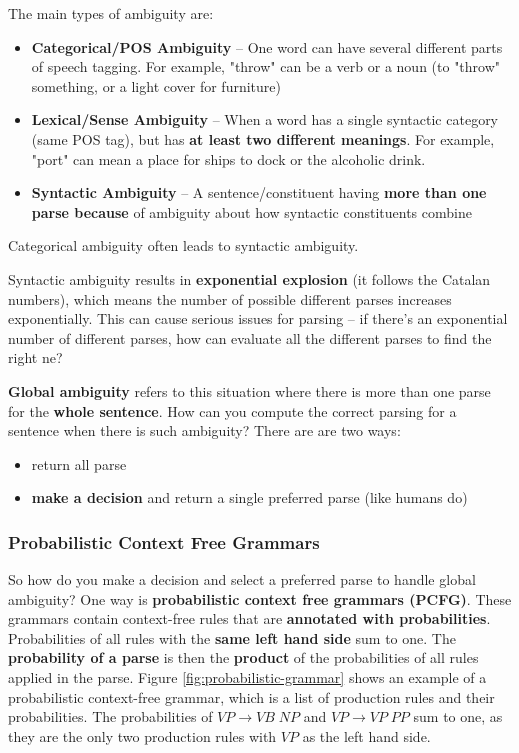 \documentclass{article}
\begin{document}
The main types of ambiguity are:
\begin{itemize}
	\item \textbf{Categorical/POS Ambiguity} -- One word can have several different parts of speech tagging. For example, "throw" can be a verb or a noun (to "throw" something, or a light cover for furniture)
	\item \textbf{Lexical/Sense Ambiguity} -- When a word has a single syntactic category (same POS tag), but has \textbf{at least two different meanings}. For example, "port" can mean a place for ships to dock or the alcoholic drink.
	\item \textbf{Syntactic Ambiguity} -- A sentence/constituent having \textbf{more than one parse because} of ambiguity about how syntactic constituents combine
\end{itemize}
Categorical ambiguity often leads to syntactic ambiguity.

Syntactic ambiguity results in \textbf{exponential explosion} (it follows the Catalan numbers), which means the number of possible different parses increases exponentially. This can cause serious issues for parsing -- if there's an exponential number of different parses, how can evaluate all the different parses to find the right ne?

\textbf{Global ambiguity} refers to this situation where there is more than one parse for the \textbf{whole sentence}. How can you compute the correct parsing for a sentence when there is such ambiguity? There are are two ways:
\begin{itemize}
	\item return all parse
	\item \textbf{make a decision} and return a single preferred parse (like humans do)
\end{itemize}

\subsubsection{Probabilistic Context Free Grammars}

So how do you make a decision and select a preferred parse to handle global ambiguity? One way is \textbf{probabilistic context free grammars (PCFG)}. These grammars contain context-free rules that are \textbf{annotated with probabilities}. Probabilities of all rules with the \textbf{same left hand side} sum to one. The \textbf{probability of a parse} is then the \textbf{product} of the probabilities of all rules applied in the parse. Figure \ref{fig:probabilistic-grammar} shows an example of a probabilistic context-free grammar, which is a list of production rules and their probabilities. The probabilities of $VP \rightarrow VB\;NP$ and $VP \rightarrow VP\;PP$ sum to one, as they are the only two production rules with $VP$ as the left hand side.
\end{document}
